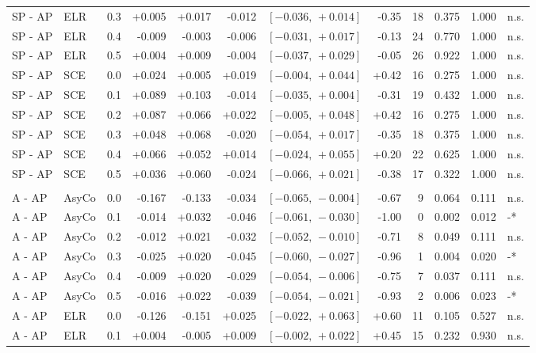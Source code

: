 \begin{landscape}
\begin{scriptsize}
\begin{longtable}{lllrrrrrrrrl}
SP - AP & ELR & 0.3 & +0.005 & +0.017 & -0.012 & $[-0.036,\,+0.014]$ & -0.35 & 18 & 0.375 & 1.000 & n.s. \\
SP - AP & ELR & 0.4 & -0.009 & -0.003 & -0.006 & $[-0.031,\,+0.017]$ & -0.13 & 24 & 0.770 & 1.000 & n.s. \\
SP - AP & ELR & 0.5 & +0.004 & +0.009 & -0.004 & $[-0.037,\,+0.029]$ & -0.05 & 26 & 0.922 & 1.000 & n.s. \\
SP - AP & SCE & 0.0 & +0.024 & +0.005 & +0.019 & $[-0.004,\,+0.044]$ & +0.42 & 16 & 0.275 & 1.000 & n.s. \\
SP - AP & SCE & 0.1 & +0.089 & +0.103 & -0.014 & $[-0.035,\,+0.004]$ & -0.31 & 19 & 0.432 & 1.000 & n.s. \\
SP - AP & SCE & 0.2 & +0.087 & +0.066 & +0.022 & $[-0.005,\,+0.048]$ & +0.42 & 16 & 0.275 & 1.000 & n.s. \\
SP - AP & SCE & 0.3 & +0.048 & +0.068 & -0.020 & $[-0.054,\,+0.017]$ & -0.35 & 18 & 0.375 & 1.000 & n.s. \\
SP - AP & SCE & 0.4 & +0.066 & +0.052 & +0.014 & $[-0.024,\,+0.055]$ & +0.20 & 22 & 0.625 & 1.000 & n.s. \\
SP - AP & SCE & 0.5 & +0.036 & +0.060 & -0.024 & $[-0.066,\,+0.021]$ & -0.38 & 17 & 0.322 & 1.000 & n.s. \\
\addlinespace
\multicolumn{12}{l}{\textit{Macro F1}} \\
A - AP & AsyCo & 0.0 & -0.167 & -0.133 & -0.034 & $[-0.065,\,-0.004]$ & -0.67 & 9 & 0.064 & 0.111 & n.s. \\
A - AP & AsyCo & 0.1 & -0.014 & +0.032 & -0.046 & $[-0.061,\,-0.030]$ & -1.00 & 0 & 0.002 & 0.012 & -* \\
A - AP & AsyCo & 0.2 & -0.012 & +0.021 & -0.032 & $[-0.052,\,-0.010]$ & -0.71 & 8 & 0.049 & 0.111 & n.s. \\
A - AP & AsyCo & 0.3 & -0.025 & +0.020 & -0.045 & $[-0.060,\,-0.027]$ & -0.96 & 1 & 0.004 & 0.020 & -* \\
A - AP & AsyCo & 0.4 & -0.009 & +0.020 & -0.029 & $[-0.054,\,-0.006]$ & -0.75 & 7 & 0.037 & 0.111 & n.s. \\
A - AP & AsyCo & 0.5 & -0.016 & +0.022 & -0.039 & $[-0.054,\,-0.021]$ & -0.93 & 2 & 0.006 & 0.023 & -* \\
A - AP & ELR & 0.0 & -0.126 & -0.151 & +0.025 & $[-0.022,\,+0.063]$ & +0.60 & 11 & 0.105 & 0.527 & n.s. \\
A - AP & ELR & 0.1 & +0.004 & -0.005 & +0.009 & $[-0.002,\,+0.022]$ & +0.45 & 15 & 0.232 & 0.930 & n.s. \\

\end{longtable}
\end{scriptsize}
\end{landscape}
